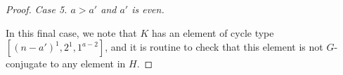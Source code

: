 \documentclass[10pt,a4paper]{amsart}
\newcommand{\vs}{\vspace{2mm}}
\begin{document}
\begin{proof}
		\vs
		
		\noindent \textit{Case 5. $a > a'$ and $a'$ is even.}
		
		\vs
		
		In this final case, we note that $K$ has an element of cycle type $[(n-a')^1,2^1, 1^{a-2}]$, and it is routine to check that this element is not $G$-conjugate to any element in $H$.
	\end{proof}
\end{document}
